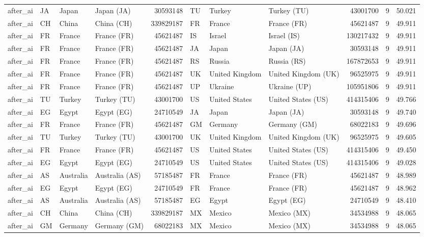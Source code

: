 \begin{tabular}{llllrlllrrr}
after\_ai & JA & Japan & Japan (JA) & 30593148 & TU & Turkey & Turkey (TU) & 43001700 & 9 & 50.021 \\
after\_ai & CH & China & China (CH) & 339829187 & FR & France & France (FR) & 45621487 & 9 & 49.911 \\
after\_ai & FR & France & France (FR) & 45621487 & IS & Israel & Israel (IS) & 130217432 & 9 & 49.911 \\
after\_ai & FR & France & France (FR) & 45621487 & JA & Japan & Japan (JA) & 30593148 & 9 & 49.911 \\
after\_ai & FR & France & France (FR) & 45621487 & RS & Russia & Russia (RS) & 167872653 & 9 & 49.911 \\
after\_ai & FR & France & France (FR) & 45621487 & UK & United Kingdom & United Kingdom (UK) & 96525975 & 9 & 49.911 \\
after\_ai & FR & France & France (FR) & 45621487 & UP & Ukraine & Ukraine (UP) & 105951806 & 9 & 49.911 \\
after\_ai & TU & Turkey & Turkey (TU) & 43001700 & US & United States & United States (US) & 414315406 & 9 & 49.766 \\
after\_ai & EG & Egypt & Egypt (EG) & 24710549 & JA & Japan & Japan (JA) & 30593148 & 9 & 49.740 \\
after\_ai & FR & France & France (FR) & 45621487 & GM & Germany & Germany (GM) & 68022183 & 9 & 49.696 \\
after\_ai & TU & Turkey & Turkey (TU) & 43001700 & UK & United Kingdom & United Kingdom (UK) & 96525975 & 9 & 49.605 \\
after\_ai & FR & France & France (FR) & 45621487 & US & United States & United States (US) & 414315406 & 9 & 49.450 \\
after\_ai & EG & Egypt & Egypt (EG) & 24710549 & US & United States & United States (US) & 414315406 & 9 & 49.028 \\
after\_ai & AS & Australia & Australia (AS) & 57185487 & FR & France & France (FR) & 45621487 & 9 & 48.989 \\
after\_ai & EG & Egypt & Egypt (EG) & 24710549 & FR & France & France (FR) & 45621487 & 9 & 48.962 \\
after\_ai & AS & Australia & Australia (AS) & 57185487 & EG & Egypt & Egypt (EG) & 24710549 & 9 & 48.410 \\
after\_ai & CH & China & China (CH) & 339829187 & MX & Mexico & Mexico (MX) & 34534988 & 9 & 48.065 \\
after\_ai & GM & Germany & Germany (GM) & 68022183 & MX & Mexico & Mexico (MX) & 34534988 & 9 & 48.065 \\

\end{tabular}
